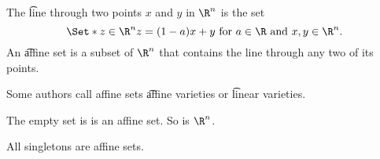 
\sbasic




















\sstart
{}



The \t{line through} two points $x$ and $y$ in $\R^n$ is the set
$$
  \Set*{z \in \R^n}{z = (1-a) x + y \text{ for } a \in \R \text{ and } x, y \in \R^n}.
$$
An \t{affine} set is a subset of $\R^n$ that contains the line through any two of its points.


Some authors call affine sets \t{affine varieties} or \t{linear varieties}.



The empty set is is an affine set.
So is $\R^n$.
\begin{prop}
  All singletons are affine sets.
\end{prop}
\strats
